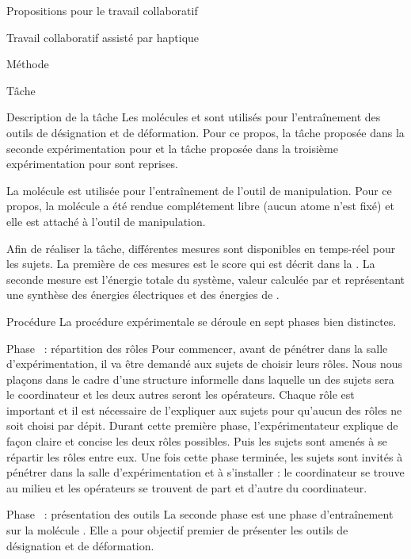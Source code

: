 \documentclass[myfrancais]{mythesis}
\begin{document}
\begin{mypart}{Propositions pour le travail collaboratif}
\begin{mychapter}{Travail collaboratif assisté par haptique}
\begin{mysection}{Méthode}
\begin{mysubsection}{Tâche}
\begin{mysubsubsection}{Description de la tâche}
						Les molécules \myTRPCAGE et \myPrion sont utilisés pour l'entraînement des outils de désignation et de déformation.
						Pour ce propos, la tâche proposée dans la seconde expérimentation pour \myTRPCAGE et la tâche proposée dans la troisième expérimentation pour \myPrion sont reprises.

						La molécule \myTRPZIPPER est utilisée pour l'entraînement de l'outil de manipulation.
						Pour ce propos, la molécule \myTRPZIPPER a été rendue complétement libre (aucun atome n'est fixé) et elle est attaché à l'outil de manipulation.

						Afin de réaliser la tâche, différentes mesures sont disponibles en temps-réel pour les sujets.
						La première de ces mesures est le score  qui est décrit dans la .
						La seconde mesure est l'énergie totale du système, valeur calculée par  et représentant une synthèse des énergies électriques et des énergies de .
					\end{mysubsubsection}
				\end{mysubsection}
				\begin{mysubsection}{Procédure}
					La procédure expérimentale se déroule en sept phases bien distinctes.
					\begin{myparagraph}{Phase~ : répartition des rôles}
						Pour commencer, avant de pénétrer dans la salle d'expérimentation, il va être demandé aux sujets de choisir leurs rôles.
						Nous nous plaçons dans le cadre d'une structure informelle dans laquelle un des sujets sera le coordinateur et les deux autres seront les opérateurs.
						Chaque rôle est important et il est nécessaire de l'expliquer aux sujets pour qu'aucun des rôles ne soit choisi par dépit.
						Durant cette première phase, l'expérimentateur explique de façon claire et concise les deux rôles possibles.
						Puis les sujets sont amenés à se répartir les rôles entre eux.
						Une fois cette phase terminée, les sujets sont invités à pénétrer dans la salle d'expérimentation et à s'installer : le coordinateur se trouve au milieu et les opérateurs se trouvent de part et d'autre du coordinateur.
					\end{myparagraph}
					\begin{myparagraph}{Phase~ : présentation des outils}
						La seconde phase est une phase d'entraînement sur la molécule \myTRPCAGE.
						Elle a pour objectif premier de présenter les outils de désignation et de déformation.

\end{myparagraph}
\end{mysubsection}
\end{mysection}
\end{mychapter}
\end{mypart}
\end{document}
